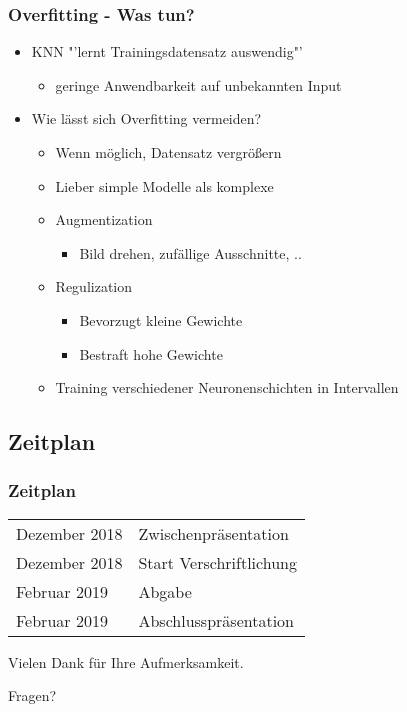 \documentclass{beamer}
\begin{document}

\begin{frame}\frametitle{Overfitting - Was tun?}
\begin{itemize}
	\item KNN "'lernt Trainingsdatensatz auswendig"'
	\begin{itemize}
		\item geringe Anwendbarkeit auf unbekannten Input
	\end{itemize}
	\item Wie lässt sich Overfitting vermeiden?
	\begin{itemize}
		\item Wenn möglich, Datensatz vergrößern
		\item Lieber simple Modelle als komplexe
		\item Augmentization
		\begin{itemize}
			\item Bild drehen, zufällige Ausschnitte, ..
		\end{itemize}
		\item Regulization
		\begin{itemize}
			\item Bevorzugt kleine Gewichte
			\item Bestraft hohe Gewichte
		\end{itemize}
		\item Training verschiedener Neuronenschichten in Intervallen
	\end{itemize}
\end{itemize}
\end{frame}


\begin{frame}\section{Zeitplan}\frametitle{Zeitplan}
\begin{tabular}{l l}
Dezember 2018 & Zwischenpräsentation\\
Dezember 2018 & Start Verschriftlichung\\
Februar 2019 & Abgabe\\
Februar 2019 & Abschlusspräsentation
\end{tabular}
\end{frame}


\begin{frame}
\centerline{Vielen Dank für Ihre Aufmerksamkeit.}
\Huge{\centerline{Fragen?}}
\end{frame}

\end{document}
